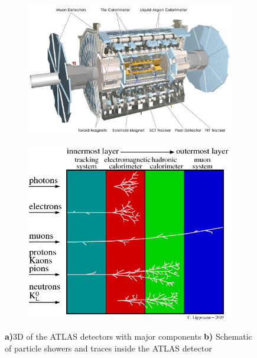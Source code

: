 \documentclass[../Bachelorarbeit.tex]{subfiles}
\begin{document}
\begin{figure}[h]
    \begin{subfigure}{0.59\textwidth}
        \centering
        \includegraphics[width=\textwidth]{images/0803012_05-A4-at-144-dpi.jpg}
        \caption{}
        \label{fig:ALTAS_detector}
    \end{subfigure}
    \begin{subfigure}{0.40\textwidth}
        \centering
        \includegraphics[width=\textwidth]{images/experiment_atlas.png}
        \caption{}
        \label{fig:calorimeter}
    \end{subfigure}
    \caption{\textbf{a)}3D of the ATLAS detectors with major components \cite{JoaoPequenao.27.03.2008} \textbf{b)} Schematic of particle showers and traces inside the ATLAS detector \cite{Lippmann.2012}}
\end{figure}
\end{document}
